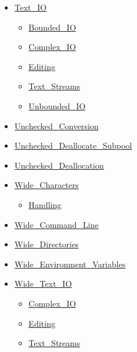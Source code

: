 \documentclass[english]{article}
\begin{document}
\begin{scriptsize}
\begin{multicols*}{5}
\begin{itemize}[leftmargin=0mm]
\begin{itemize}[leftmargin=5mm]
\begin{itemize}[leftmargin=5mm]
	\item[] \href{http://www.ada-auth.org/standards/22rm/html/RM-A-10-1.html}{Text\_IO}
	  \begin{itemize}[leftmargin=5mm]
	  \item[] \href{http://www.ada-auth.org/standards/22rm/html/RM-A-10-11.html}{Bounded\_IO}
	  \item[] \href{http://www.ada-auth.org/standards/22rm/html/RM-G-1-3.html}{Complex\_IO}
	  \item[] \href{http://www.ada-auth.org/standards/22rm/html/RM-F-3-3.html}{Editing}
	  \item[] \href{http://www.ada-auth.org/standards/22rm/html/RM-A-12-2.html}{Text\_Streams}
	  \item[] \href{http://www.ada-auth.org/standards/22rm/html/RM-A-10-12.html}{Unbounded\_IO}
	  \end{itemize}
	\item[] \href{http://www.ada-auth.org/standards/22rm/html/RM-13-9.html}{Unchecked\_Conversion}
	\item[] \href{http://www.ada-auth.org/standards/22rm/html/RM-13-11-5.html}{Unchecked\_Deallocate\_Subpool}
	\item[] \href{http://www.ada-auth.org/standards/22rm/html/RM-13-11-2.html}{Unchecked\_Deallocation}
	\item[] \href{http://www.ada-auth.org/standards/22rm/html/RM-A-3-1.html}{Wide\_Characters}
	  \begin{itemize}[leftmargin=5mm]
	  \item[] \href{http://www.ada-auth.org/standards/22rm/html/RM-A-3-5.html}{Handling}
	  \end{itemize}
	\item[] \href{http://www.ada-auth.org/standards/22rm/html/RM-A-15-1.html}{Wide\_Command\_Line}
	\item[] \href{http://www.ada-auth.org/standards/22rm/html/RM-A-16-2.html}{Wide\_Directories}
	\item[] \href{http://www.ada-auth.org/standards/22rm/html/RM-A-17-1.html}{Wide\_Environment\_Variables}
	\item[] \href{http://www.ada-auth.org/standards/22rm/html/RM-A-11.html}{Wide\_Text\_IO}
	  \begin{itemize}[leftmargin=5mm]
	  \item[] \href{http://www.ada-auth.org/standards/22rm/html/RM-G-1-4.html}{Complex\_IO}
	  \item[] \href{http://www.ada-auth.org/standards/22rm/html/RM-F-3-4.html}{Editing}
	  \item[] \href{http://www.ada-auth.org/standards/22rm/html/RM-A-12-3.html}{Text\_Streams}

\end{itemize}
\end{itemize}
\end{itemize}
\end{itemize}
\end{multicols*}
\end{scriptsize}
\end{document}
